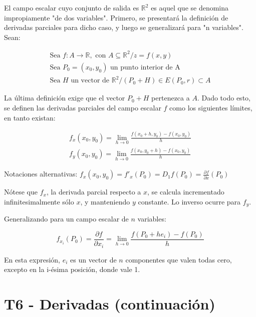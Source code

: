\documentclass{article}
\renewcommand{\Bbb}{\mathbb}
\begin{document}
El campo escalar cuyo conjunto de salida es $\Bbb R^2$ es aquel que se denomina impropiamente "de dos variables". Primero, se presentará la definición de derivadas parciales para dicho caso, y luego se generalizará para "n variables". Sean:

\begin{subequations}
\begin{align}
\text{Sea } f: A \rightarrow \Bbb R, \text{ con } A \subseteq \Bbb R^2 / z = f(x,y) \\
\text{Sea } P_0 = (x_0, y_0) \text{ un punto interior de A} \\
\text{Sea } H \text{ un vector de } \Bbb R^2 / (P_0 + H) \in E(P_0, r) \subset A
\end{align}
\end{subequations}

La última definición exige que el vector $P_0 + H$ pertenezca a $A$. Dado todo esto, se definen las derivadas parciales del campo escalar $f$ como los siguientes límites, en tanto existan:

\begin{subequations}
\begin{align}
f_x(x_0, y_0) = \lim_{h \rightarrow 0} \frac{f(x_0 + h, y_0) - f(x_0, y_0)}{h} \\
f_y(x_0, y_0) = \lim_{h \rightarrow 0} \frac{f(x_0, y_0 + h) - f(x_0, y_0)}{h}
\end{align}
\end{subequations}

Notaciones alternativas: $f_x(x_0, y_0) = f'_x(P_0) = D_1 f(P_0) = \frac{\partial f}{\partial x} (P_0)$

Nótese que $f_x$, la derivada parcial respecto a $x$, se calcula incrementado infinitesimalmente sólo $x$, y manteniendo $y$ constante. Lo inverso ocurre para $f_y$.

Generalizando para un campo escalar de $n$ variables:

\begin{equation}
f_{x_i}(P_0) = \frac{\partial f}{\partial x_i} = \lim_{h \rightarrow 0} \frac{f(P_0 + h e_i) - f(P_0)}{h}
\end{equation}

En esta expresión, $e_i$ es un vector de $n$ componentes que valen todas cero, excepto en la i-ésima posición, donde vale 1.

\section{T6 - Derivadas (continuación)}
\end{document}
